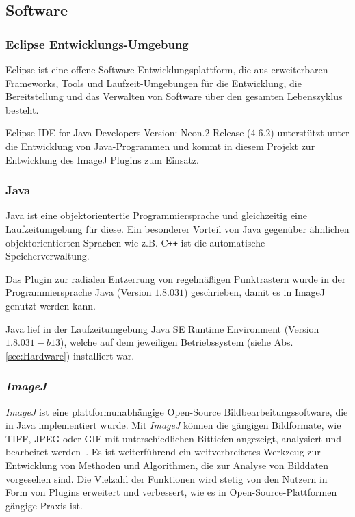 \subsection{Software}\label{sec:Software}

\subsubsection{Eclipse Entwicklungs-Umgebung}
Eclipse ist eine offene Software-Entwicklungsplattform, die aus erweiterbaren Frameworks, Tools und Laufzeit-Umgebungen für die Entwicklung, die Bereitstellung und das Verwalten von Software über den gesamten Lebenszyklus besteht.
\cite{eclipse}

Eclipse IDE for Java Developers Version: Neon.2 Release (4.6.2)
unterstützt unter die Entwicklung von Java-Programmen und kommt in diesem Projekt zur Entwicklung des ImageJ Plugins zum Einsatz.


\subsubsection{Java}
Java ist eine objektorientertie Programmiersprache und gleichzeitig eine Laufzeitumgebung für diese. Ein besonderer Vorteil von Java gegenüber ähnlichen objektorientierten Sprachen wie z.B. C\texttt{++} ist die automatische Speicherverwaltung. \cite{java}

Das Plugin zur radialen Entzerrung von regelmäßigen Punktrastern wurde in der Programmiersprache Java (Version $ 1.8.0 31 $) geschrieben, damit es in ImageJ genutzt werden kann.

Java lief in der Laufzeitumgebung Java SE Runtime Environment (Version $ 1.8.0 31-b13 $), welche auf dem jeweiligen Betriebssystem (siehe Abs. \ref{sec:Hardware}) installiert war.

\subsubsection{\textit{ImageJ}}
\textit{ImageJ} ist eine plattformunabhängige Open-Source Bildbearbeitungssoftware, die in Java implementiert wurde. Mit \textit{ImageJ} können die gängigen Bildformate, wie TIFF, JPEG oder GIF mit unterschiedlichen Bittiefen angezeigt, analysiert und bearbeitet werden~\cite{Collins_ImageJ}. Es ist weiterführend ein weitverbreitetes Werkzeug zur Entwicklung von Methoden und Algorithmen, die zur Analyse von Bilddaten vorgesehen sind. Die Vielzahl der Funktionen wird stetig von den Nutzern in Form von Plugins erweitert und verbessert, wie es in Open-Source-Plattformen gängige Praxis ist.

